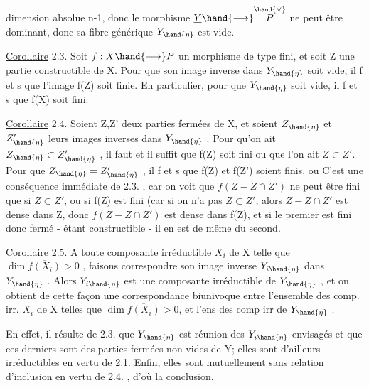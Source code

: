 
dimension absolue n-1, donc le morphisme $\underline{Y}\hand{\longrightarrow} \overset{\hand{\vee}}{P}$ ne peut être dominant,
donc sa fibre générique $Y_{\hand{\eta}}$ est vide.

\uline{Corollaire} 2.3. Soit $f:X\hand{\longrightarrow} P$ un morphisme de type fini, et soit Z une
partie constructible de X. Pour que son image inverse dans $Y_{\hand{\eta}}$ soit vide,
il f et s que l'image f(Z) soit finie. En particulier, pour que  $Y_{\hand{\eta}}$ soit
vide, il f et s que f(X) soit fini.

\uline{Corollaire} 2.4. Soient Z,Z' deux parties fermées  de X,
et soient $Z_{\hand{\eta}}$ et $Z'_{\hand{\eta}}$ leurs images inverses dans $Y_{\hand{\eta}}$ . Pour qu'on ait
$Z_{\hand{\eta}}\subset Z'_{\hand{\eta}}$ , il faut et il suffit que f(Z) soit fini ou que l'on ait $Z\subset Z'$.
Pour que $Z_{\hand{\eta}} = Z'_{\hand{\eta}}$ , il f et s que  f(Z) et f(Z') soient finis, ou 
 C'est une conséquence 
 immédiate de 2.3. , car on voit que $f(Z - Z\cap Z')$ ne peut être fini
que si $Z\subset Z'$, ou si f(Z) est fini (car si on n'a pas $Z\subset Z'$, alors $Z-Z\cap Z'$
est dense dans Z, donc $f(Z-Z\cap Z')$ est dense dans f(Z), et si le premier
est fini donc fermé - étant constructible - il en est de même du second.

\uline{Corollaire} 2.5. A toute composante irréductible $X_i$ de X telle que
$\dim \overline{f(X_i)} > 0$ , faisons correspondre  son image inverse $Y_{i\hand{\eta}}$ dans
$Y_{\hand{\eta}}$ . Alors $Y_{i\hand{\eta}}$ est une composante irréductible de $Y_{\hand{\eta}}$ , et on obtient de
cette façon une correspondance biunivoque entre l'ensemble des comp. irr.
$X_i$ de X telles que $\dim \overline{f(X_i)}> 0$, et l'ens des comp irr de $Y_{\hand{\eta}}$ .

En effet, il résulte de 2.3. que  $Y_{\hand{\eta}}$ est réunion des $Y_{i\hand{\eta}}$ envisagés
et que ces derniers sont des parties fermées non vides de Y; elles sont
d'ailleurs irréductibles en vertu de 2.1. Enfin, elles sont mutuellement
sans relation d'inclusion en vertu de 2.4. , d'où la conclusion.

